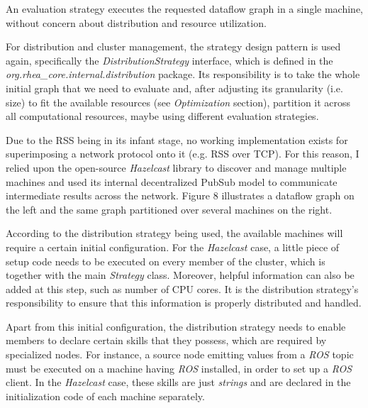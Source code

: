 \documentclass{dithesis}
\begin{document}

An evaluation strategy executes the requested dataflow graph in a single machine, without concern about distribution and resource utilization.

For distribution and cluster management, the strategy design pattern is used again, specifically the \textit{DistributionStrategy} interface, which is defined in the \textit{org.rhea\_core.internal.distribution} package. Its responsibility is to take the whole initial graph that we need to evaluate and, after adjusting its granularity (i.e. size) to fit the available resources (see \textit{Optimization} section), partition it across all computational resources, maybe using different evaluation strategies.


Due to the RSS being in its infant stage, no working implementation exists for superimposing a network protocol onto it (e.g. RSS over TCP). For this reason, I relied upon the open-source \textit{Hazelcast} library to discover and manage multiple machines and used its internal decentralized PubSub model to communicate intermediate results across the network. Figure 8 illustrates a dataflow graph on the left and the same graph partitioned over several machines on the right.



According to the distribution strategy being used, the available machines will require a certain initial configuration. For the \textit{Hazelcast} case, a little piece of setup code needs to be executed on every member of the cluster, which is together with the main \textit{Strategy} class. Moreover, helpful information can also be added at this step, such as number of CPU cores. It is the distribution strategy's responsibility to ensure that this information is properly distributed and handled.

Apart from this initial configuration, the distribution strategy needs to enable members to declare certain skills that they possess, which are required by specialized nodes. For instance, a source node emitting values from a \textit{ROS} topic must be executed on a machine having \textit{ROS} installed, in order to set up a \textit{ROS} client. In the \textit{Hazelcast} case, these skills are just \textit{strings} and are declared in the initialization code of each machine separately.
\end{document}
